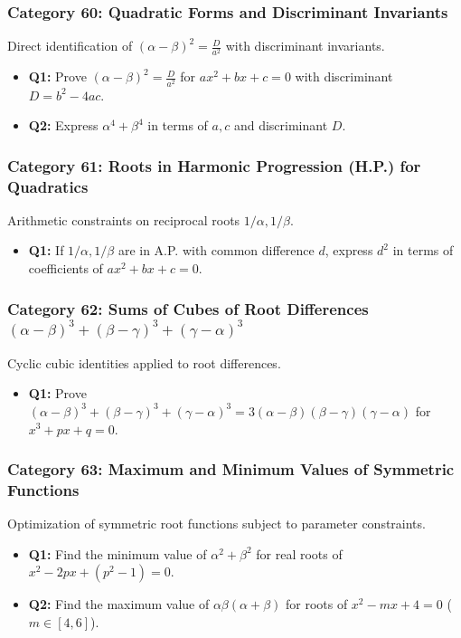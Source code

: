 \documentclass[10pt,a4paper]{article}
\begin{document}
\subsubsection{Category 60: Quadratic Forms and Discriminant Invariants}
Direct identification of $(\alpha - \beta)^2 = \frac{D}{a^2}$ with discriminant invariants.
\begin{itemize}[leftmargin=*]
    \item \textbf{Q1:} Prove $(\alpha - \beta)^2 = \frac{D}{a^2}$ for $ax^2 + bx + c = 0$ with discriminant $D = b^2 - 4ac$.
    \item \textbf{Q2:} Express $\alpha^4 + \beta^4$ in terms of $a, c$ and discriminant $D$.
\end{itemize}

\subsubsection{Category 61: Roots in Harmonic Progression (H.P.) for Quadratics}
Arithmetic constraints on reciprocal roots $1/\alpha, 1/\beta$.
\begin{itemize}[leftmargin=*]
    \item \textbf{Q1:} If $1/\alpha, 1/\beta$ are in A.P. with common difference $d$, express $d^2$ in terms of coefficients of $ax^2 + bx + c = 0$.
\end{itemize}

\subsubsection{Category 62: Sums of Cubes of Root Differences $(\alpha - \beta)^3 + (\beta - \gamma)^3 + (\gamma - \alpha)^3$}
Cyclic cubic identities applied to root differences.
\begin{itemize}[leftmargin=*]
    \item \textbf{Q1:} Prove $(\alpha - \beta)^3 + (\beta - \gamma)^3 + (\gamma - \alpha)^3 = 3(\alpha - \beta)(\beta - \gamma)(\gamma - \alpha)$ for $x^3 + px + q = 0$.
\end{itemize}

\subsubsection{Category 63: Maximum and Minimum Values of Symmetric Functions}
Optimization of symmetric root functions subject to parameter constraints.
\begin{itemize}[leftmargin=*]
    \item \textbf{Q1:} Find the minimum value of $\alpha^2 + \beta^2$ for real roots of $x^2 - 2px + (p^2 - 1) = 0$.
    \item \textbf{Q2:} Find the maximum value of $\alpha\beta(\alpha+\beta)$ for roots of $x^2 - mx + 4 = 0$ ($m \in [4,6]$).
\end{itemize}
\end{document}
